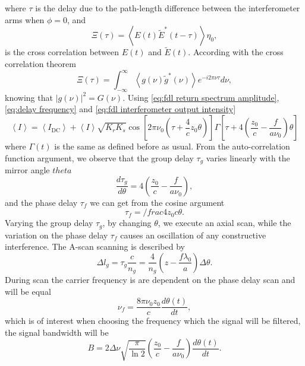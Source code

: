 \documentclass[12pt,twoside,english]{book}
\renewcommand{\~}{\perispomeni}%
\numberwithin{equation}{section}
\numberwithin{figure}{section}
\begin{document}
where $\tau$ is the delay due to the path-length difference between the interferometer arms when $\phi=0$, and
\begin{equation}
\Xi\left(\tau\right)={\left<E\left(t\right)\tilde{E}^*\left(t-\tau\right)\right>}{\eta_0},
\end{equation}
is the cross correlation between $E\left(t\right)$ and $\tilde{E}\left(t\right)$. According with the cross correlation theorem
\begin{equation}
\Xi\left(\tau\right)=\int_{-\infty}^{\infty}\left\langle g\left(\nu\right)\tilde{g}^{*}\left(\nu\right)\right\rangle e^{-i2\pi\nu\tau}d\nu,
\label{eq:cross correlation theorem}
\end{equation}
knowing that $\left|g\left(\nu\right)\right|^{2}=G\left(\nu\right)$. Using \ref{eq:fdl return spectrum amplitude}, \ref{eq:delay frequency} and \ref{eq:fdl interferometer output intensity}
\begin{equation}
\left\langle I\right\rangle =\left\langle I_{\text{DC}}\right\rangle +\left\langle I\right\rangle \sqrt{K_{r}K_{s}}\cos\left[2\pi\nu_{0}\left(\tau+\frac{4}{c}z_{0}\theta\right)\right]\Gamma\left[\tau+4\left(\frac{z_{0}}{c}-\frac{f}{a\nu_{0}}\right)\theta\right]
\label{eq:fdl final output intensity}
\end{equation}
where $\Gamma\left(t\right)$ is the same as defined before as usual. From the auto-correlation function argument, we observe that the group delay $\tau_g$ varies linearly with the mirror angle $theta$
\begin{equation}
\frac{d\tau_{g}}{d\theta}=4\left(\frac{z_{0}}{c}-\frac{f}{a\nu_{0}}\right),
\end{equation}
and the phase delay $\tau_f$ we can get from the cosine argument
\begin{equation}
\tau_f=/frac{4z_0}{c}\theta.
\label{eq:fase delay}
\end{equation}
Varying the group delay $\tau_g$, by changing $\theta$, we execute an axial scan, while the variation on the phase delay $\tau_f$ causes an oscillation of any constructive interference. The A-scan scanning is described by
\begin{equation}
\Delta l_g=\tau_g\frac{c}{n_g}=\frac{4}{n_g}\left(z-\frac{f\lambda_0}{a}\right)\Delta\theta.
\label{eq:delay angle}
\end{equation}
During scan the carrier frequency is are dependent on the phase delay scan and will be equal
\begin{equation}
\nu_f=\frac{8\pi\nu_0 z_0}{c}\frac{d\theta\left(t\right)}{dt},
\label{eq:carrier frequency}
\end{equation}
which is of interest when choosing the frequency which the signal will be filtered, the signal bandwidth will be
\begin{equation}
B=2\Delta\nu\sqrt{\frac{\pi}{\ln2}}\left(\frac{z_0}{c}-\frac{f}{a\nu_0}\right)\frac{d\theta\left(t\right)}{dt}.
\label{eq:signal bandwidth}
\end{equation}
\end{document}
